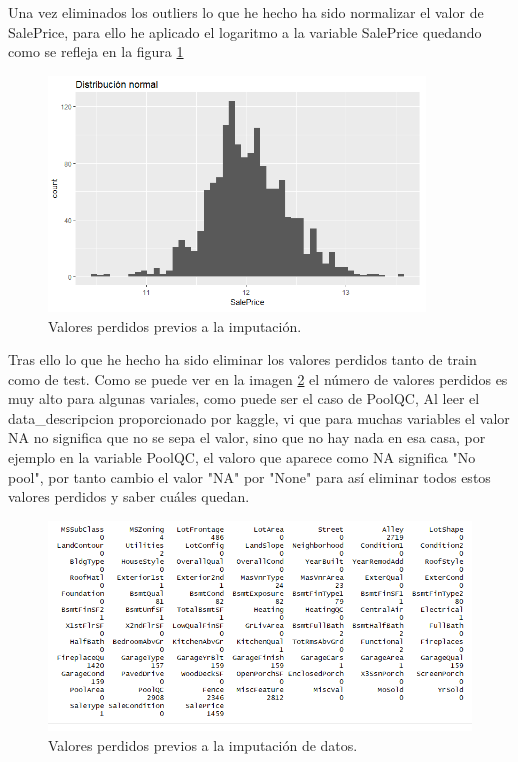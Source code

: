 \documentclass[14pt]{extarticle}
\begin{document}
Una vez eliminados los outliers lo que he hecho ha sido normalizar el valor de SalePrice, para ello he aplicado el logaritmo a la variable SalePrice quedando como se refleja en la figura \ref{im2}

\begin{figure}[h!]
	\centering
	\includegraphics[width=10cm]{img/SalePriceNormalice.png}
	\caption{Valores perdidos previos a la imputación.}
	\label{im2}
\end{figure}

Tras ello lo que he hecho ha sido eliminar los valores perdidos tanto de train como de test. Como se puede ver en la imagen \ref{im3} el número de valores perdidos es muy alto para algunas variales, como puede ser el caso de PoolQC, Al leer el data\_descripcion proporcionado por kaggle, vi que para muchas variables el valor NA no significa que no se sepa el valor, sino que no hay nada en esa casa, por ejemplo en la variable PoolQC, el valoro que aparece como NA significa "No pool", por tanto cambio el valor "NA" por "None" para así eliminar todos estos valores perdidos y saber cuáles quedan. \\	


\begin{figure}[h!]
	\centering
	\includegraphics[width=15cm]{img/fullna.png}
	\caption{Valores perdidos previos a la imputación de datos.}
	\label{im3}
\end{figure}
\end{document}

